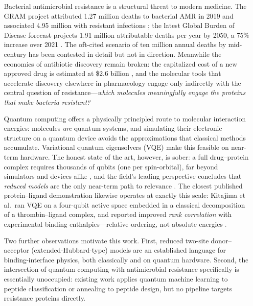 \documentclass[10pt,twocolumn]{article}
\begin{document}
Bacterial antimicrobial resistance is a structural threat to modern medicine. The GRAM
project attributed 1.27 million deaths to bacterial AMR in 2019 and associated 4.95
million with resistant infections \cite{murray2022}; the latest Global Burden of Disease
forecast projects 1.91 million attributable deaths per year by 2050, a 75\% increase over
2021 \cite{naghavi2024}. The oft-cited scenario of ten million annual deaths by mid-century
\cite{oneill2016} has been contested in detail but not in direction. Meanwhile the
economics of antibiotic discovery remain broken: the capitalized cost of a new approved
drug is estimated at \$2.6 billion \cite{dimasi2016}, and the molecular tools that
accelerate discovery elsewhere in pharmacology engage only indirectly with the central
question of resistance---\emph{which molecules meaningfully engage the proteins that make
bacteria resistant?}

Quantum computing offers a physically principled route to molecular interaction energies:
molecules \emph{are} quantum systems, and simulating their electronic structure on a
quantum device avoids the approximations that classical methods accumulate. Variational
quantum eigensolvers (VQE) \cite{peruzzo2014,kandala2017} make this feasible on
near-term hardware. The honest state of the art, however, is sober: a full drug--protein
complex requires thousands of qubits (one per spin-orbital), far beyond simulators and
devices alike \cite{cao2019,blunt2022}, and the field's leading perspective concludes
that \emph{reduced models} are the only near-term path to relevance
\cite{santagati2024}. The closest published protein--ligand demonstration likewise
operates at exactly this scale: Kitajima et al.\ ran VQE on a four-qubit active space
embedded in a classical decomposition of a thrombin--ligand complex, and reported
improved \emph{rank correlation} with experimental binding enthalpies---relative
ordering, not absolute energies \cite{kitajima2026}.

Two further observations motivate this work. First, reduced two-site donor--acceptor
(extended-Hubbard-type) models are an established language for binding-interface
physics, both classically \cite{wouters2016} and on quantum hardware. Second, the
intersection of quantum computing with antimicrobial resistance specifically is
essentially unoccupied: existing work applies quantum machine learning to peptide
classification \cite{zhuang2024,london2024} or annealing to peptide design, but no
pipeline targets resistance proteins directly.
\end{document}

